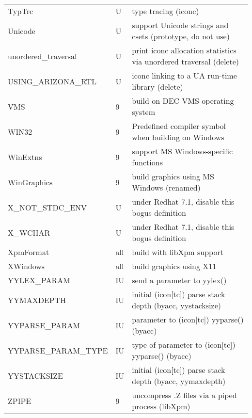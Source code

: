 \begin{xtabular}{|m{1.8in}|m{0.5in}|m{4.0in}|}
TypTrc & U & type tracing (iconc) \\
Unicode & U & support Unicode strings and csets (prototype, do not use) \\
unordered\_traversal & U & print iconc allocation statistics via unordered traversal (delete) \\
USING\_ARIZONA\_RTL & U & iconc linking to a UA run-time library (delete) \\
VMS & 9 & build on DEC VMS operating system \\
WIN32 & 9 & Predefined compiler symbol when building  on Windows \\
WinExtns & 9 & support MS Windows-specific functions \\
WinGraphics & 9 & build graphics using MS Windows (renamed) \\
X\_NOT\_STDC\_ENV & U & under Redhat 7.1, disable this bogus definition \\
X\_WCHAR & U & under Redhat 7.1, disable this bogus definition \\
XpmFormat & all & build with libXpm support \\
XWindows & all & build graphics using X11 \\
YYLEX\_PARAM & IU & send a parameter to yylex() \\
YYMAXDEPTH & IU & initial (icon[tc]) parse stack depth (byacc, yystacksize) \\
YYPARSE\_PARAM & IU & parameter to (icon[tc]) yyparse() (byacc) \\
YYPARSE\_PARAM\_TYPE & IU & type of parameter to (icon[tc]) yyparse() (byacc) \\
YYSTACKSIZE & IU & initial (icon[tc]) parse stack depth (byacc, yymaxdepth) \\
ZPIPE & 9 & uncompress .Z files via a piped process (libXpm) \\
\hline
\end{xtabular}

